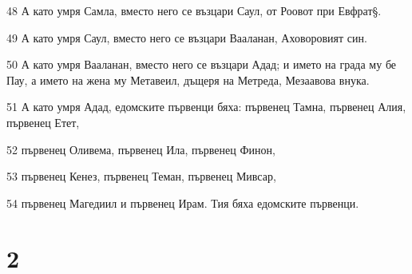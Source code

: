 \par 48 А като умря Самла, вместо него се възцари Саул, от Роовот при Евфрат§.
\par 49 А като умря Саул, вместо него се възцари Вааланан, Аховоровият син.
\par 50 А като умря Вааланан, вместо него се възцари Адад; и името на града му бе Пау, а името на жена му Метавеил, дъщеря на Метреда, Мезаавова внука.
\par 51 А като умря Адад, едомските първенци бяха: първенец Тамна, първенец Алия, първенец Етет,
\par 52 първенец Оливема, първенец Ила, първенец Финон,
\par 53 първенец Кенез, първенец Теман, първенец Мивсар,
\par 54 първенец Магедиил и първенец Ирам. Тия бяха едомските първенци.

\chapter{2}

